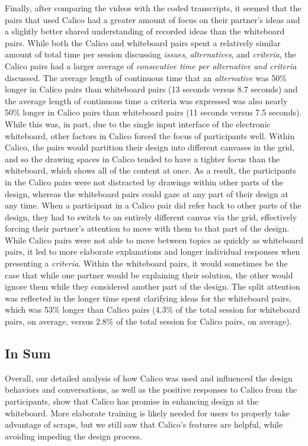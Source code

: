 Finally, after comparing the videos with the coded transcripts, it seemed that the pairs that used Calico had a greater amount of focus on their partner's ideas and a slightly better shared understanding of recorded ideas than the whiteboard pairs. While both the Calico and whiteboard pairs spent a relatively similar amount of total time per session discussing \emph{issues}, \emph{alternatives}, and \emph{criteria}, the Calico pairs had a larger average of \emph{consecutive time per alternative and criteria} discussed. The average length of continuous time that an \emph{alternative} was 50\% longer in Calico pairs than whiteboard pairs (13 seconds versus 8.7 seconds) and the average length of continuous time a criteria was expressed was also nearly 50\% longer in Calico pairs than whiteboard pairs (11 seconds versus 7.5 seconds). While this was, in part, due to the single input interface of the electronic whiteboard, other factors in Calico forced the focus of participants well. Within Calico, the pairs would partition their design into different canvases in the grid, and so the drawing spaces in Calico tended to have a tighter focus than the whiteboard, which shows all of the content at once. As a result, the participants in the Calico pairs were not distracted by drawings within other parts of the design, whereas the whiteboard pairs could gaze at any part of their design at any time. When a participant in a Calico pair did refer back to other parts of the design, they had to switch to an entirely different canvas via the grid, effectively forcing their partner's attention to move with them to that part of the design. While Calico pairs were not able to move between topics as quickly as whiteboard pairs, it led to more elaborate explanations and longer individual responses when presenting a \emph{criteria}. Within the whiteboard pairs, it would sometimes be the case that while one partner would be explaining their solution, the other would ignore them while they considered another part of the design. The split attention was reflected in the longer time spent clarifying ideas for the whiteboard pairs, which was 53\% longer than Calico pairs (4.3\% of the total session for whiteboard pairs, on average, versus 2.8\% of the total session for Calico pairs, on average). 

\subsection {In Sum}
\label{discussion:6}

Overall, our detailed analysis of how Calico was used and influenced the design behaviors and conversations, as well as the positive responses to Calico from the participants, show that Calico has promise in enhancing design at the whiteboard. More elaborate training is likely needed for users to properly take advantage of scraps, but we still saw that Calico's features are helpful, while avoiding impeding the design process. 

